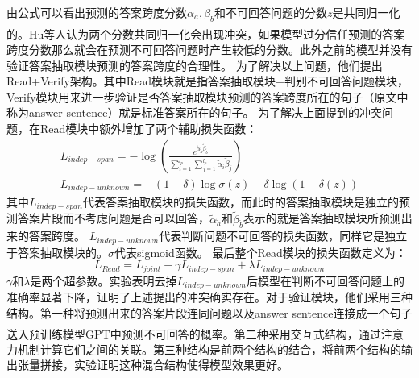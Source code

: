 \documentclass{article}
\newcommand{\upcite}[1]{\textsuperscript{\textsuperscript{\cite{#1}}}}
\begin{document}
由公式可以看出预测的答案跨度分数$\alpha_a,\beta_b$和不可回答问题的分数$z$是共同归一化的。Hu等人\upcite{ReadVerify}认为两个分数共同归一化会出现冲突，如果模型过分信任预测的答案跨度分数那么就会在预测不可回答问题时产生较低的分数。此外之前的模型并没有验证答案抽取模块预测的答案跨度的合理性。
为了解决以上问题，他们提出Read+Verify架构。其中Read模块就是指答案抽取模块+判别不可回答问题模块，
Verify模块用来进一步验证是否答案抽取模块预测的答案跨度所在的句子（原文中称为answer sentence）就是标准答案所在的句子。
为了解决上面提到的冲突问题，在Read模块中额外增加了两个辅助损失函数：
\begin{gather}
L_{indep-span}=-\log(\displaystyle\frac{e^{\widetilde{\alpha}_{\widetilde{a}}\widetilde{\beta}_{\widetilde{b}}}}{\sum_{i=1}^{l_p}\sum_{j=1}^{l_p}\widetilde{\alpha}_{i}\widetilde{\beta}_{j}}) \\
L_{indep-unknown}=-(1-\delta)\log\sigma(z)-\delta\log(1-\delta(z))
\end{gather}
其中$L_{indep-span}$代表答案抽取模块的损失函数，而此时的答案抽取模块是独立的预测答案片段而不考虑问题是否可以回答，$\widetilde{\alpha}_{\widetilde{a}}$和$\widetilde{\beta}_{\widetilde{b}}$表示的就是答案抽取模块所预测出来的答案跨度。
$L_{indep-unknown}$代表判断问题不可回答的损失函数，同样它是独立于答案抽取模块的。$\sigma$代表sigmoid函数。
最后整个Read模块的损失函数定义为：
\begin{equation}
L_{Read}=L_{joint}+\gamma L_{indep-span}+\lambda L_{indep-unknown}
\end{equation}
$\gamma$和$\lambda$是两个超参数。实验表明去掉$L_{indep-unknown}$后模型在判断不可回答问题上的准确率显著下降，证明了上述提出的冲突确实存在。对于验证模块，他们采用三种结构。第一种将预测出来的答案片段连同问题以及answer sentence连接成一个句子送入预训练模型GPT\upcite{GPT}中预测不可回答的概率。第二种采用交互式结构，通过注意力机制计算它们之间的关联。第三种结构是前两个结构的结合，将前两个结构的输出张量拼接，实验证明这种混合结构使得模型效果更好。

\end{document}

